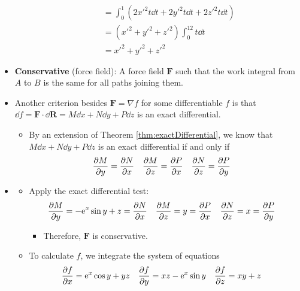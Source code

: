 \documentclass[../main.tex]{subfiles}
\begin{document}
\begin{itemize}
\begin{itemize}
\begin{align*}
            &= \int_0^1(2x'^2t\dd{t}+2y'^2t\dd{t}+2z'^2t\dd{t})\\
            &= (x'^2+y'^2+z'^2)\int_0^12t\dd{t}\\
            &= x'^2+y'^2+z'^2
        \end{align*}
        \endgroup
    \end{itemize}
    \item \textbf{Conservative} (force field): A force field $\mathbf{F}$ such that the work integral from $A$ to $B$ is the same for all paths joining them.
    \item Another criterion besides $\mathbf{F}=\nabla f$ for some differentiable $f$ is that $\dd{f}=\mathbf{F}\cdot\dd{\mathbf{R}}=M\dd{x}+N\dd{y}+P\dd{z}$ is an exact differential.
    \begin{itemize}
        \item By an extension of Theorem \ref{thm:exactDifferential}, we know that $M\dd{x}+N\dd{y}+P\dd{z}$ is an exact differential if and only if
        \begin{align*}
            \pdv{M}{y} &= \pdv{N}{x}&
            \pdv{M}{z} &= \pdv{P}{x}&
            \pdv{N}{z} &= \pdv{P}{y}
        \end{align*}
    \end{itemize}
    \item {}
    \begin{itemize}
        \item Apply the exact differential test:
        \begin{align*}
            \pdv{M}{y} &= -\e[x]\sin y+z = \pdv{N}{x}&
            \pdv{M}{z} &= y = \pdv{P}{x}&
            \pdv{N}{z} &= x = \pdv{P}{y}
        \end{align*}
        \begin{itemize}
            \item Therefore, $\mathbf{F}$ is conservative.
        \end{itemize}
        \item To calculate $f$, we integrate the system of equations
        \begin{align*}
            \pdv{f}{x} &= \e[x]\cos y+yz&
            \pdv{f}{y} &= xz-\e[x]\sin y&
            \pdv{f}{z} &= xy+z
        \end{align*}
        \begin{itemize}

\end{itemize}
\end{itemize}
\end{itemize}
\end{document}
